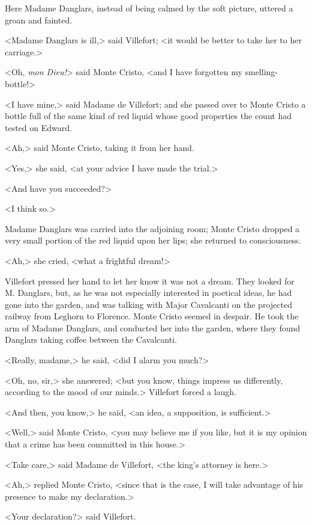 Here Madame Danglars, instead of being calmed by the soft picture, uttered a groan and fainted. 

 <Madame Danglars is ill,> said Villefort; <it would be better to take her to her carriage.> 

 <Oh, \textit{mon Dieu!}> said Monte Cristo, <and I have forgotten my smelling-bottle!> 

 <I have mine,> said Madame de Villefort; and she passed over to Monte Cristo a bottle full of the same kind of red liquid whose good properties the count had tested on Edward. 

 <Ah,> said Monte Cristo, taking it from her hand. 

 <Yes,> she said, <at your advice I have made the trial.> 

 <And have you succeeded?> 

 <I think so.> 

 Madame Danglars was carried into the adjoining room; Monte Cristo dropped a very small portion of the red liquid upon her lips; she returned to consciousness. 

 <Ah,> she cried, <what a frightful dream!> 

 Villefort pressed her hand to let her know it was not a dream. They looked for M. Danglars, but, as he was not especially interested in poetical ideas, he had gone into the garden, and was talking with Major Cavalcanti on the projected railway from Leghorn to Florence. Monte Cristo seemed in despair. He took the arm of Madame Danglars, and conducted her into the garden, where they found Danglars taking coffee between the Cavalcanti. 

 <Really, madame,> he said, <did I alarm you much?> 

 <Oh, no, sir,> she answered; <but you know, things impress us differently, according to the mood of our minds.> Villefort forced a laugh. 

 <And then, you know,> he said, <an idea, a supposition, is sufficient.> 

 <Well,> said Monte Cristo, <you may believe me if you like, but it is my opinion that a crime has been committed in this house.> 

 <Take care,> said Madame de Villefort, <the king's attorney is here.> 

 <Ah,> replied Monte Cristo, <since that is the case, I will take advantage of his presence to make my declaration.> 

 <Your declaration?> said Villefort. 

